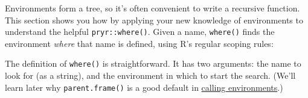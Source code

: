 
Environments form a tree, so it's often convenient to write a recursive
function. This section shows you how by applying your new knowledge of
environments to understand the helpful \texttt{pryr::where()}. Given a
name, \texttt{where()} finds the environment \emph{where} that name is
defined, using R's regular scoping rules:

\begin{Shaded}
\begin{Highlighting}[]
\StringTok{ }
\NormalTok{(}\NormalTok{)}
\NormalTok{(}\NormalTok{)}
\end{Highlighting}
\end{Shaded}

The definition of \texttt{where()} is straightforward. It has two
arguments: the name to look for (as a string), and the environment in
which to start the search. (We'll learn later why
\texttt{parent.frame()} is a good default in
\hyperref[calling-environments]{calling environments}.)

\begin{Shaded}
\begin{Highlighting}[]
\StringTok{ } \NormalTok{()) \{}
  \NormalTok{())) \{}
    \NormalTok{(} \NormalTok{)}
    
    \NormalTok{)) \{}
    
    
  \NormalTok{\}}
\NormalTok{\}}
\end{Highlighting}
\end{Shaded}

